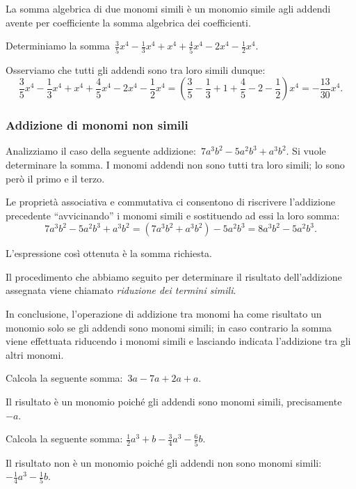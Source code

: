 \osservazione La somma algebrica di due monomi simili è un monomio simile agli
addendi avente per coefficiente la somma algebrica dei coefficienti.

\begin{exrig}
 \begin{esempio}
Determiniamo la somma~$\frac{3}{5}x^{4}-\frac{1}{3}x^{4}+x^{4}+\frac{4}{5}x^{4}-2x^{4}-\frac{1}{2}x^{4}$.

Osserviamo che tutti gli addendi sono tra loro simili dunque:
\[\frac{3}{5}x^{4}-\frac{1}{3}x^{4}+x^{4}+\frac{4}{5}x^{4}-2x^{4}-\frac{1}{2}x^{4}=\left(\frac{3}{5}-\frac{1}{3}+1+\frac{4}{5}-2-\frac{1}{2}\right)x^{4}=-{\frac{13}{30}}x^{4}.\]
\end{esempio}
\end{exrig}

\subsubsection{Addizione di monomi non simili}

Analizziamo il caso della seguente
addizione:~$7a^{3}b^{2}-5a^{2}b^{3}+a^{3}b^{2}$. Si vuole determinare
la somma. I monomi addendi non sono tutti tra loro simili; lo sono
però il primo e il terzo.

Le proprietà associativa e commutativa ci consentono di riscrivere
l'addizione precedente
``avvicinando'' i monomi simili e
sostituendo ad essi la loro
somma:
\[7a^{3}b^{2}-5a^{2}b^{3}+a^{3}b^{2}=(7a^{3}b^{2}+a^{3}b^{2})-5a^{2}b^{3}=8a^{3}b^{2}-5a^{2}b^{3}.\]

L'espressione così ottenuta è la somma richiesta.


Il procedimento che abbiamo seguito per determinare il risultato
dell'addizione assegnata viene chiamato
\emph{riduzione dei termini simili}.

In conclusione, l'operazione di addizione tra monomi ha
come risultato un monomio solo se gli addendi sono monomi simili; in
caso contrario la somma viene effettuata riducendo i monomi simili e
lasciando indicata l'addizione tra gli altri monomi.

\begin{exrig}
 \begin{esempio}
Calcola la seguente somma:~$3a-7a+2a+a$.

Il risultato è un monomio poiché gli addendi sono monomi
simili, precisamente $-a$.
 \end{esempio}

 \begin{esempio}
Calcola la seguente somma:
$\frac{1}{2}a^{3}+b-\frac{3}{4}a^{3}-\frac{6}{5}b$.

Il risultato non è un monomio poiché gli addendi non sono
monomi simili: $-{\frac{1}{4}}a^{3}-\frac{1}{5}b$.
 \end{esempio}
\end{exrig}

